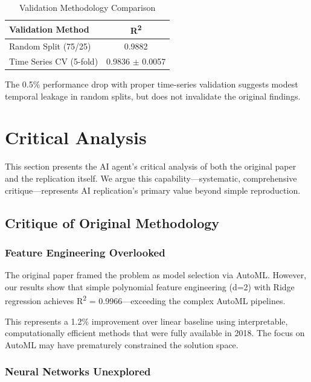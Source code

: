 \documentclass[conference]{IEEEtran}
\begin{document}
\begin{table}[htbp]
\caption{Validation Methodology Comparison}
\label{tab:validation}
\centering
\begin{tabular}{lc}
\toprule
\textbf{Validation Method} & \textbf{R\textsuperscript{2}} \\
\midrule
Random Split (75/25) & 0.9882 \\
Time Series CV (5-fold) & 0.9836 $\pm$ 0.0057 \\
\bottomrule
\end{tabular}
\end{table}

The 0.5\% performance drop with proper time-series validation suggests modest temporal leakage in random splits, but does not invalidate the original findings.

\section{Critical Analysis}

This section presents the AI agent's critical analysis of both the original paper and the replication itself. We argue this capability---systematic, comprehensive critique---represents AI replication's primary value beyond simple reproduction.

\subsection{Critique of Original Methodology}

\subsubsection{Feature Engineering Overlooked}

The original paper framed the problem as model selection via AutoML. However, our results show that simple polynomial feature engineering (d=2) with Ridge regression achieves R\textsuperscript{2} = 0.9966---exceeding the complex AutoML pipelines.

This represents a 1.2\% improvement over linear baseline using interpretable, computationally efficient methods that were fully available in 2018. The focus on AutoML may have prematurely constrained the solution space.

\subsubsection{Neural Networks Unexplored}
\end{document}
